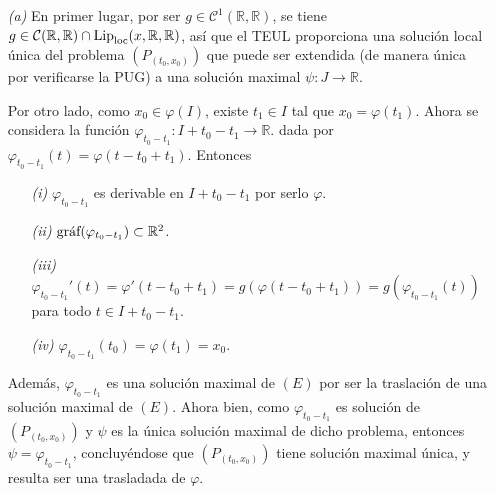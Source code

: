 \documentclass[11pt]{report}
\newcommand{\R}{\mathbb R}
\begin{document}
\begin{itemize}
\item[\textit{(a)}]
En primer lugar, por ser $g \in \mathcal{C}^1(\R,\R)$, se tiene $g \in \mathcal{C}(\R,\R)\cap \textup{Lip}_{\textup{loc}}(x,\R,\R)$, así que el TEUL proporciona una solución local única del problema $(P_{(t_0,x_0)})$ que puede ser extendida (de manera única por verificarse la PUG) a una solución maximal $\psi \colon J \to \R$.

\vspace{2mm}

Por otro lado, como $x_0 \in \varphi(I)$, existe $t_1 \in I$ tal que $x_0=\varphi(t_1)$. Ahora se considera la función $\varphi_{t_0-t_1} \colon I+t_0-t_1 \to \R$. dada por $\varphi_{t_0-t_1}(t)=\varphi(t-t_0+t_1)$. Entonces
\begin{itemize}
    \item[\textit{(i)}] $\varphi_{t_0-t_1}$ es derivable en $I+t_0-t_1$ por serlo $\varphi$.
    \item[\textit{(ii)}] $\textup{gráf}(\varphi_{t_0-t_1}) \subset \R^2$.
    \item[\textit{(iii)}] ~$\varphi_{t_0-t_1}'(t)=\varphi'(t-t_0+t_1)=g(\varphi(t-t_0+t_1))=g(\varphi_{t_0-t_1}(t))$ para todo $t \in I+t_0-t_1$.
    \item[\textit{(iv)}] $\varphi_{t_0-t_1}(t_0)=\varphi(t_1)=x_0$.
\end{itemize}

Además, $\varphi_{t_0-t_1}$ es una solución maximal de $(E)$ por ser la traslación de una solución maximal de $(E)$. Ahora bien, como $\varphi_{t_0-t_1}$ es solución de $(P_{(t_0,x_0)})$ y $\psi$ es la única solución maximal de dicho problema, entonces $\psi =\varphi_{t_0-t_1}$, concluyéndose que $(P_{(t_0,x_0)})$ tiene solución maximal única, y resulta ser una trasladada de $\varphi$.

\vspace{2mm}


\end{itemize}
\end{document}
